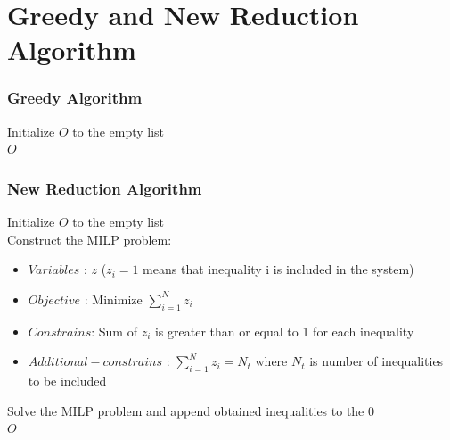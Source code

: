 \documentclass{beamer}
\begin{document}
\section{Greedy and New Reduction Algorithm}

\begin{frame}
\footnotesize
\frametitle{Greedy Algorithm}
\begin{algorithm}[H]
    \DontPrintSemicolon
    \caption{Pseudo-code for Greedy Algorithm }
    \label{alg:greedy}
    Initialize $O$ to the empty list \\
    \Return $O$
\end{algorithm}

\end{frame}
\begin{frame}
\footnotesize
\frametitle{New Reduction Algorithm}
\begin{algorithm}[H]
    \DontPrintSemicolon
    \caption{Pseudo-code for New Reduction Algorithm }
    \label{alg:newreduction}
    Initialize $O$ to the empty list \\
    Construct the MILP problem: 
    \begin{itemize}
        \item $Variables$ : $z$ ($z_i =1 $ means that inequality i is included in the system) 
        \item $Objective$ : Minimize  $ \sum_{i=1}^{N} z_i $	
        \item $Constrains$: Sum of $z_i$ is greater than or equal to 1 for each inequality 
        \item $Additional-constrains$ : $ \sum_{i=1}^{N} z_i = N_t $ where $N_t$ is number of inequalities to be included
    \end{itemize}
    Solve the MILP problem and append obtained inequalities to the $0$ \\
    \Return $O$
\end{algorithm}

\end{frame}
\end{document}
